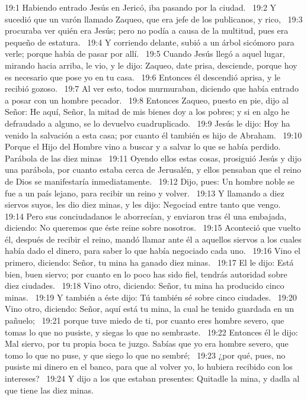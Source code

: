 19:1 Habiendo entrado Jesús en Jericó, iba pasando por la ciudad.  
19:2 Y sucedió que un varón llamado Zaqueo, que era jefe de los publicanos, y rico,  
19:3 procuraba ver quién era Jesús; pero no podía a causa de la multitud, pues era pequeño de estatura.  
19:4 Y corriendo delante, subió a un árbol sicómoro para verle; porque había de pasar por allí.  
19:5 Cuando Jesús llegó a aquel lugar, mirando hacia arriba, le vio, y le dijo: Zaqueo, date prisa, desciende, porque hoy es necesario que pose yo en tu casa.  
19:6 Entonces él descendió aprisa, y le recibió gozoso.  
19:7 Al ver esto, todos murmuraban, diciendo que había entrado a posar con un hombre pecador.  
19:8 Entonces Zaqueo, puesto en pie, dijo al Señor: He aquí, Señor, la mitad de mis bienes doy a los pobres; y si en algo he defraudado a alguno, se lo devuelvo cuadruplicado.  
19:9 Jesús le dijo: Hoy ha venido la salvación a esta casa; por cuanto él también es hijo de Abraham.  
19:10 Porque el Hijo del Hombre vino a buscar y a salvar lo que se había perdido. 
Parábola de las diez minas  
19:11 Oyendo ellos estas cosas, prosiguió Jesús y dijo una parábola, por cuanto estaba cerca de Jerusalén, y ellos pensaban que el reino de Dios se manifestaría inmediatamente.  
19:12 Dijo, pues: Un hombre noble se fue a un país lejano, para recibir un reino y volver.  
19:13 Y llamando a diez siervos suyos, les dio diez minas, y les dijo: Negociad entre tanto que vengo.  
19:14 Pero sus conciudadanos le aborrecían, y enviaron tras él una embajada, diciendo: No queremos que éste reine sobre nosotros.  
19:15 Aconteció que vuelto él, después de recibir el reino, mandó llamar ante él a aquellos siervos a los cuales había dado el dinero, para saber lo que había negociado cada uno.  
19:16 Vino el primero, diciendo: Señor, tu mina ha ganado diez minas.  
19:17 El le dijo: Está bien, buen siervo; por cuanto en lo poco has sido fiel, tendrás autoridad sobre diez ciudades.  
19:18 Vino otro, diciendo: Señor, tu mina ha producido cinco minas.  
19:19 Y también a éste dijo: Tú también sé sobre cinco ciudades.  
19:20 Vino otro, diciendo: Señor, aquí está tu mina, la cual he tenido guardada en un pañuelo;  
19:21 porque tuve miedo de ti, por cuanto eres hombre severo, que tomas lo que no pusiste, y siegas lo que no sembraste.  
19:22 Entonces él le dijo: Mal siervo, por tu propia boca te juzgo. Sabías que yo era hombre severo, que tomo lo que no puse, y que siego lo que no sembré;  
19:23 ¿por qué, pues, no pusiste mi dinero en el banco, para que al volver yo, lo hubiera recibido con los intereses?  
19:24 Y dijo a los que estaban presentes: Quitadle la mina, y dadla al que tiene las diez minas.  

